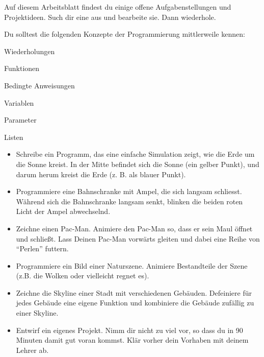 \documentclass[9pt, a5paper]{arbeitsblatt}
\begin{document}
\ReiheTitel

Auf diesem Arbeitsblatt findest du einige offene Aufgabenstellungen und Projektideen. Such dir eine aus und bearbeite sie. Dann wiederhole.

Du solltest die folgenden Konzepte der Programmierung mittlerweile kennen:
\begin{multicols}{3}\centering
	Wiederholungen

	Funktionen

	Bedingte Anweisungen

	Variablen

	Parameter

	Listen
\end{multicols}

\begin{itemize}
	\item Schreibe ein Programm, das eine einfache Simulation zeigt, wie die Erde um die Sonne kreist. In der Mitte befindet sich die Sonne (ein gelber Punkt), und darum herum kreist die Erde (z. B. als blauer Punkt).

	\item Programmiere eine Bahnschranke mit Ampel, die sich langsam schliesst. Während sich die Bahnschranke langsam senkt, blinken die beiden roten Licht der Ampel abwechselnd.

	\item Zeichne einen Pac-Man. Animiere den Pac-Man so, dass er sein Maul öffnet und schließt. Lass Deinen Pac-Man vorwärts gleiten und dabei eine Reihe von \enquote{Perlen} futtern.

	\item Programmiere ein Bild einer Naturszene. Animiere Bestandteile der Szene (z.B. die Wolken oder vielleicht regnet es).

	\item Zeichne die Skyline einer Stadt mit verschiedenen Gebäuden. Defeiniere für jedes Gebäude eine eigene Funktion und kombiniere die Gebäude zufällig zu einer Skyline.

	\item Entwirf ein eigenes Projekt. Nimm dir nicht zu viel vor, so dass du in 90 Minuten damit gut voran kommst. Klär vorher dein Vorhaben mit deinem Lehrer ab.
\end{itemize}
\end{document}
